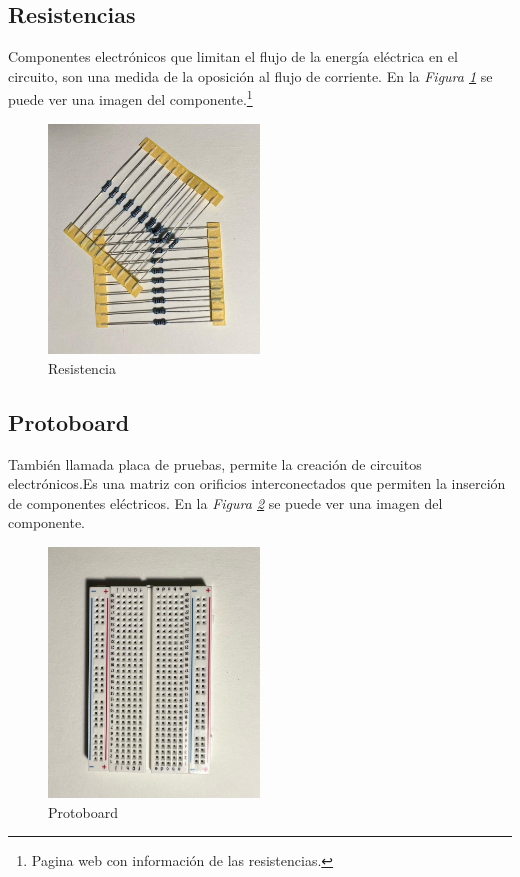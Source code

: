 \subsection{Resistencias}
Componentes electrónicos que limitan el flujo de la energía eléctrica en el circuito, son una medida de la oposición al flujo de corriente.  En la \textit{Figura \ref{fig:Resistencias}} se puede ver una imagen del componente.\cite{Resistencia}\footnote{Pagina web con información de las resistencias\cite{Resistencia}.}
\begin{figure}[h]
        \centering
        \includegraphics[width=0.5\textwidth]{img/Resistencias.png}
        \caption{Resistencia}
        \label{fig:Resistencias}
    \end{figure}
    
\subsection{Protoboard}
También llamada placa de pruebas, permite la creación de circuitos electrónicos.Es una matriz con orificios interconectados que permiten la inserción de componentes eléctricos. En la \textit{Figura \ref{fig:Protoboard} } se puede ver una imagen del componente.
\begin{figure}[h]
        \centering
        \includegraphics[angle=90,width=0.5\textwidth]{img/Protoboard.png}
        \caption{Protoboard}
        \label{fig:Protoboard}
    \end{figure}

